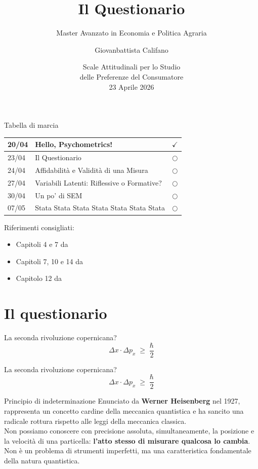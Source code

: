 \documentclass{beamer}
\title[Lezione 2]{Il Questionario}
\subtitle{Master Avanzato in Economia e Politica Agraria}
\author{Giovanbattista Califano}
\date[Portici, 23/04/2026]{Scale Attitudinali per lo Studio \\ delle Preferenze del Consumatore \\ 23 Aprile 2026}
\institute[UNINA]{Università degli Studi di Napoli Federico II, giovanbattista.califano@unina.it}
\begin{document}
\frame{\titlepage}

\begin{frame}{Tabella di marcia}
    \begin{center}
        \begin{tabular}{|l|l|c|}
        \hline
        20/04 &  Hello, Psychometrics! & $\checkmark$ \\
        \hline
        23/04 &  Il Questionario & $\bigcirc$ \\
        \hline
        24/04 & Affidabilità e Validità di una Misura & $\bigcirc$ \\
        \hline
        27/04 & Variabili Latenti: Riflessive o Formative? & $\bigcirc$ \\
        \hline
        30/04 & Un po' di SEM & $\bigcirc$ \\
        \hline
        07/05 & Stata Stata Stata Stata Stata Stata Stata & $\bigcirc$ \\
        \hline
        \end{tabular}
    \end{center}
\vspace{0.1cm}
\footnotesize
Riferimenti consigliati: \\
\begin{itemize}
    \item Capitoli 4 e 7 da \cite{jhangiani2019research}
    \item Capitoli 7, 10 e 14 da \cite{olivero2022psicologia}
    \item Capitolo 12 da \cite{mehmetoglu2022applied}
\end{itemize}
\scriptsize


\end{frame}

\section{Il questionario}
\begin{frame}{La seconda rivoluzione copernicana?}
\huge
    \[
      \Delta x \cdot \Delta p_x \;\ge\; \frac{\hbar}{2}
    \]
\end{frame}

\begin{frame}{La seconda rivoluzione copernicana?}
    \[
      \Delta x \cdot \Delta p_x \;\ge\; \frac{\hbar}{2}
    \]
\begin{block}{Principio di indeterminazione}
\small
    Enunciato da \textbf{Werner Heisenberg} nel 1927, rappresenta un concetto cardine della meccanica quantistica e ha sancito una radicale rottura rispetto alle leggi della meccanica classica. \\
    \smallskip
    Non possiamo conoscere con precisione assoluta, simultaneamente, la posizione e la velocità di una particella: \textbf{l’atto stesso di misurare qualcosa lo cambia}. Non è un problema di strumenti imperfetti, ma una caratteristica fondamentale della natura quantistica.
\end{block}
\end{frame}
\end{document}
